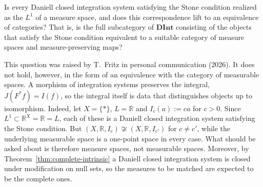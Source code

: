 \begin{problem}\label{prob:stone-measure-spaces}
  Is every Daniell closed integration system satisfying the Stone condition
  realized as the $L^1$ of a measure space, and does this correspondence lift to
  an equivalence of categories?
  That is, is the full subcategory of $\mathbf{DInt}$ consisting of the objects
  that satisfy the Stone condition equivalent to a suitable category of measure
  spaces and measure-preserving maps?
\end{problem}

\noindent
This question was raised by T.~Fritz in personal communication (2026).
It does not hold, however, in the form of an equivalence with the category of
measurable spaces.
A morphism of integration systems preserves the integral, $J(F^*f)=I(f)$, so the
integral itself is data that distinguishes objects up to isomorphism.
Indeed, let $X=\{*\}$, $L=\mathbb{R}$ and $I_c(a):=ca$ for $c>0$.
Since $L^1\subset\mathbb{R}^X=\mathbb{R}=L$, each of these is a Daniell closed
integration system satisfying the Stone condition.
But $(X,\mathbb{R},I_c)\not\cong(X,\mathbb{R},I_{c'})$ for $c\ne c'$, while the
underlying measurable space is a one-point space in every case.
What should be asked about is therefore measure spaces, not measurable spaces.
Moreover, by Theorem~\ref{thm:complete-intrinsic} a Daniell closed integration
system is closed under modification on null sets, so the measures to be matched
are expected to be the complete ones.
